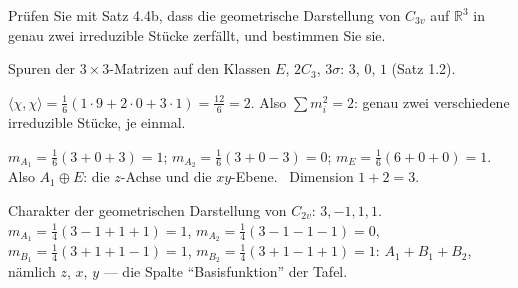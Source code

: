 \begin{aufgabe}
Prüfen Sie mit Satz 4.4b, dass die geometrische Darstellung von $C_{3v}$ auf $\mathbb R^{3}$ in genau zwei irreduzible Stücke zerfällt, und bestimmen Sie sie.

\loesung
{}
Spuren der $3\times3$-Matrizen auf den Klassen $E$, $2C_3$, $3\sigma$: $3$, $0$, $1$ (Satz 1.2).

$\langle\chi, \chi\rangle = \frac16(1\cdot9 + 2\cdot0 + 3\cdot1) = \frac{12}{6} = 2$. Also $\sum m_i^{2} = 2$: genau zwei verschiedene irreduzible Stücke, je einmal.

$m_{A_1} = \frac16(3 + 0 + 3) = 1$; $m_{A_2} = \frac16(3 + 0 - 3) = 0$; $m_E = \frac16(6 + 0 + 0) = 1$. Also $A_1\oplus E$: die $z$-Achse und die $xy$-Ebene. \checkmark\ Dimension $1 + 2 = 3$. \checkmark

Charakter der geometrischen Darstellung von $C_{2v}$: $3, -1, 1, 1$. $m_{A_1} = \frac14(3 - 1 + 1 + 1) = 1$, $m_{A_2} = \frac14(3 - 1 - 1 - 1) = 0$, $m_{B_1} = \frac14(3 + 1 + 1 - 1) = 1$, $m_{B_2} = \frac14(3 + 1 - 1 + 1) = 1$: $A_1 + B_1 + B_2$, nämlich $z$, $x$, $y$ --- die Spalte \enquote{Basisfunktion} der Tafel. \checkmark

\begin{center}
\begin{minipage}{0.88\textwidth}
\end{minipage}
\end{center}
\end{aufgabe}

